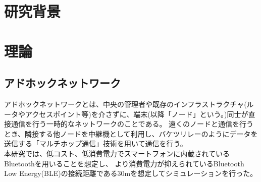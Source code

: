 \documentclass[a4paper, 10pt]{ltjsarticle}
\begin{document}
\setlength{\columnsep}{7.5mm}

\twocolumn[
    \begin{center}
        {\vspace{-1em}}

        {\fontsize{15pt}{15pt}\selectfont{災害時を想定したアドホックネットワーク構築手法の検討}}

        {\vspace{1.5em}}

        {\fontsize{13pt}{13pt}\selectfont{}}
    \end{center}



    \begin{flushright}
      {\fontsize{11pt}{11pt}\selectfont{T5-17　末廣隼人\\}}
      {\fontsize{11pt}{11pt}\selectfont{指導教員　髙﨑和之}}
    \end{flushright}

    \vspace{1em}

    \thispagestyle{empty}
]

\section{研究背景}


\section{理論}
\subsection{アドホックネットワーク}
アドホックネットワークとは、中央の管理者や既存のインフラストラクチャ(ルータやアクセスポイント等)を介さずに、端末(以降「ノード」という。)同士が直接通信を行う一時的なネットワークのことである。
遠くのノードと通信を行うとき、隣接する他ノードを中継機として利用し、バケツリレーのようにデータを送信する「マルチホップ通信」技術を用いて通信を行う。%
\\ \indent 本研究では、低コスト、低消費電力でスマートフォンに内蔵されているBluetoothを用いることを想定し、
より消費電力が抑えられているBluetooth Low Energy(BLE)の接続距離である30mを想定してシミュレーションを行った。
\end{document}
